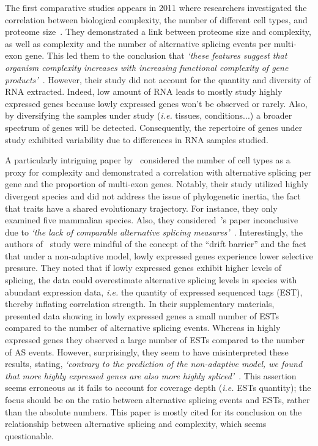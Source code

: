 The first comparative studies appears in 2011 where researchers investigated the correlation between biological complexity, the number of different cell types, and proteome size~\citep{schad_relationship_2011}. They demonstrated a link between proteome size and complexity, as well as complexity and the number of alternative splicing events per multi-exon gene. This led them to the conclusion that \textit{`these features suggest that organism complexity increases with increasing functional complexity of gene products'~\citep{schad_relationship_2011}}. However, their study did not account for the quantity and diversity of RNA extracted. Indeed, low amount of RNA leads to mostly study highly expressed genes because lowly expressed genes won't be observed or rarely. Also, by diversifying the samples under study (\textit{i.e.} tissues, conditions...) a broader spectrum of genes will be detected. Consequently, the repertoire of genes under study exhibited variability due to differences in RNA samples studied.

A particularly intriguing paper by~\citet{chen_correcting_2014} considered the number of cell types as a proxy for complexity and demonstrated a correlation with alternative splicing per gene and the proportion of multi-exon genes. Notably, their study utilized highly divergent species and did not address the issue of phylogenetic inertia, the fact that traits have a shared evolutionary trajectory. For instance, they only examined five mammalian species. Also, they considered~\citet{schad_relationship_2011}'s paper inconclusive due to \textit{`the lack of comparable alternative splicing measures'~\citep{chen_correcting_2014}}. Interestingly, the authors of~\citep{chen_correcting_2014} study were mindful of the concept of the “drift barrier” and the fact that under a non-adaptive model, lowly expressed genes experience lower selective pressure. They noted that if lowly expressed genes exhibit higher levels of splicing, the data could overestimate alternative splicing levels in species with abundant expression data, \textit{i.e.} the quantity of expressed sequenced tags (EST), thereby inflating correlation strength. In their supplementary materials,~\citet{chen_correcting_2014} presented data showing in lowly expressed genes a small number of ESTs compared to the number of alternative splicing events. Whereas in highly expressed genes they observed a large number of ESTs compared to the number of AS events. However, surprisingly, they seem to have misinterpreted these results, stating, \textit{`contrary to the prediction of the non-adaptive model, we found that more highly expressed genes are also more highly spliced'~\citep{chen_correcting_2014}}. This assertion seems erroneous as it fails to account for coverage depth (\textit{i.e.} ESTs quantity); the focus should be on the ratio between alternative splicing events and ESTs, rather than the absolute numbers. This paper is mostly cited for its conclusion on the relationship between alternative splicing and complexity, which seems questionable.

